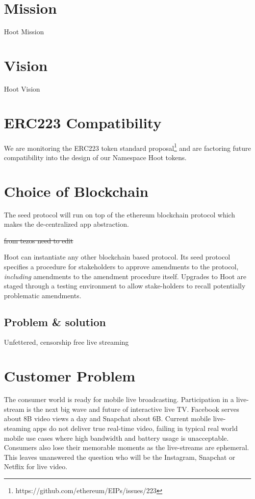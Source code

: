 \documentclass{article}
\begin{document}
\section{Mission}
Hoot Mission

\section{Vision}
Hoot Vision

\section{ERC223 Compatibility}
We are monitoring the ERC223 token standard proposal\footnote{https://github.com/ethereum/EIPs/issues/223} and are factoring future compatibility into the design of our Namespace Hoot tokens.

\section{Choice of Blockchain}
The seed protocol will run on top of the ethereum blockchain protocol which makes the de-centralized app abstraction. 

\sout{from tezos need to edit}

Hoot can instantiate any other blockchain based protocol. Its seed protocol specifies a procedure for stakeholders to approve amendments to the protocol,
\emph{including} amendments to the amendment procedure itself.
Upgrades to Hoot are staged through a testing environment to allow stake-holders to recall potentially problematic amendments.


\subsection{Problem \& solution}
Unfettered, censorship free live streaming


\section{Customer Problem}
The consumer world is ready for mobile live broadcasting. Participation in a live-stream is the next big wave and future of interactive live TV. Facebook serves about 8B video views a day and Snapchat about 6B. Current mobile live-steaming apps do not deliver true real-time video, failing in typical real world mobile use cases where high bandwidth and battery usage is unacceptable. Consumers also lose their memorable moments as the live-streams are ephemeral. This leaves unanswered the question who will be the Instagram, Snapchat or Netflix for live video.
\end{document}
